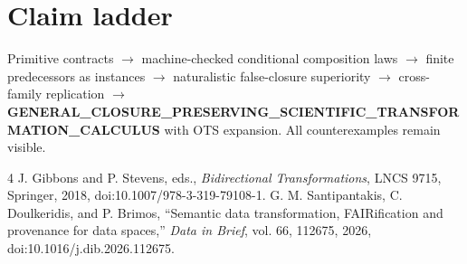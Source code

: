 \documentclass[11pt]{article}
\begin{document}
\section{Claim ladder}
Primitive contracts $\rightarrow$ machine-checked conditional composition laws $\rightarrow$ finite predecessors as instances $\rightarrow$ naturalistic false-closure superiority $\rightarrow$ cross-family replication $\rightarrow$ \textbf{GENERAL\_CLOSURE\_PRESERVING\_SCIENTIFIC\_TRANSFORMATION\_CALCULUS} with OTS expansion. All counterexamples remain visible.

\begin{thebibliography}{4}
 J. Gibbons and P. Stevens, eds., \emph{Bidirectional Transformations}, LNCS 9715, Springer, 2018, doi:10.1007/978-3-319-79108-1.
 G. M. Santipantakis, C. Doulkeridis, and P. Brimos, ``Semantic data transformation, FAIRification and provenance for data spaces,'' \emph{Data in Brief}, vol. 66, 112675, 2026, doi:10.1016/j.dib.2026.112675.
\end{thebibliography}
\end{document}
